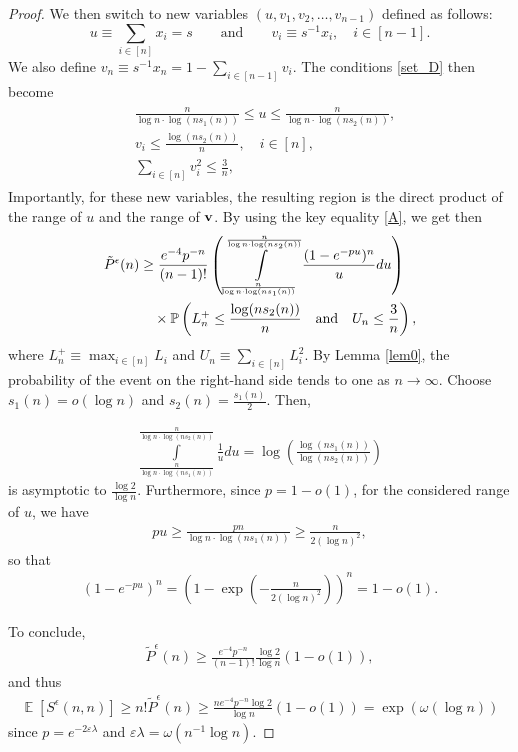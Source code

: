 \documentclass[11pt]{amsart}
\newcommand{\E}{\operatorname{\mathbb{E}}}
\newcommand{\Prob}{\operatorname{\Bbb{P}}}
\def\eps{\varepsilon}
\theoremstyle{remark}
\numberwithin{equation}{section}
\begin{document}
\begin{proof}
We then switch to new variables $(u,v_1,v_2,\ldots,v_{n-1})$ defined as follows:
\begin{equation*}
    u \equiv \sum_{i \in [n]} x_i = s \qquad \text{and} \qquad v_i \equiv
    s^{-1}x_i, \quad i \in [n-1].
\end{equation*}
We also define $v_n \equiv s^{-1}x_n=1-\sum_{i \in [n-1]}v_i$. The conditions \eqref{set_D} then become
\begin{align}
\begin{split}
&\frac{n}{\log n\cdot\log(ns_1(n))}  \leq u \leq \frac{n}{\log n\cdot\log(ns_2(n))}, \\
&v_i \leq \frac{\log(ns_2(n))}{n},\quad i \in [n],\\
&\sum_{i \in [n]}v_i^2\leq \frac{3}{n},
\end{split}
\end{align}
Importantly, for these new variables, the resulting region is the direct product of the range of $u$ and the range of $\bold v$. By using the key equality \eqref{A},  we get then
\begin{align*}
\tilde{P}^\epsilon(n)& \geq \frac{e^{-4}p^{-n}}{(n-1)!} \left( \int\limits_{\frac{n}{\log n\cdot\log(n s_1(n))}}^{\frac{n}{\log n\cdot\log(ns_2(n))}} \frac{(1 - e^{-pu})^n}{u} du \right)\\
&\quad\times \Prob\left(L^+_n  \leq \frac{\log(n s_2(n))}{n} \quad \text{and} \quad U_n \leq \frac{3}{n}\right),
\end{align*}
where $L^+_n \equiv  \max_{i \in [n]} L_i$ and $U_n \equiv \sum_{i \in [n]}L_i^2$. By Lemma \ref{lem0},  the probability of the event on the right-hand side tends to one as $n \to \infty$. Choose $s_1(n)=o(\log n)$ and $s_2(n)=\frac{s_1(n)}{2}$. Then,

\begin{align*}
\int\limits_{\frac{n}{\log n\cdot\log(n s_1(n))}}^{\frac{n}{\log n\cdot\log(ns_2(n))}} \frac{1}{u} du =\log \left(\frac{\log(ns_1(n))}{\log(ns_2(n))}\right)
\end{align*}
is asymptotic to $\frac{\log 2}{\log n}$. Furthermore,  since $p = 1-o(1)$, for the considered range of $u$, we have
\begin{align*}
    pu \geq \frac{pn}{\log n\cdot\log(n s_1(n))} \geq \frac{n}{2(\log n)^2},
\end{align*}
so that
\begin{align*}
    (1 - e^{-pu})^n = \left(1-\exp\left(-\frac{n}{2(\log n)^2}\right)\right)^n = 1-o(1).
\end{align*}

To conclude,
\begin{align*}
\tilde{P}^\epsilon(n) \geq \frac{e^{-4}p^{-n}}{(n-1)!}  \frac{\log 2}{\log n} (1-o(1)),  
\end{align*}
and thus
\begin{align*}
\E[S^\epsilon (n,n)] \geq n! \tilde{P}^\epsilon(n)  \geq \frac{n e^{-4}p^{-n}\log 2}{\log n} (1-o(1))=\exp(\omega(\log n))
\end{align*}
since $p=e^{-2\eps \lambda}$ and $\eps\lambda=\omega(n^{-1}\log n)$.
\end{proof}
\end{document}
